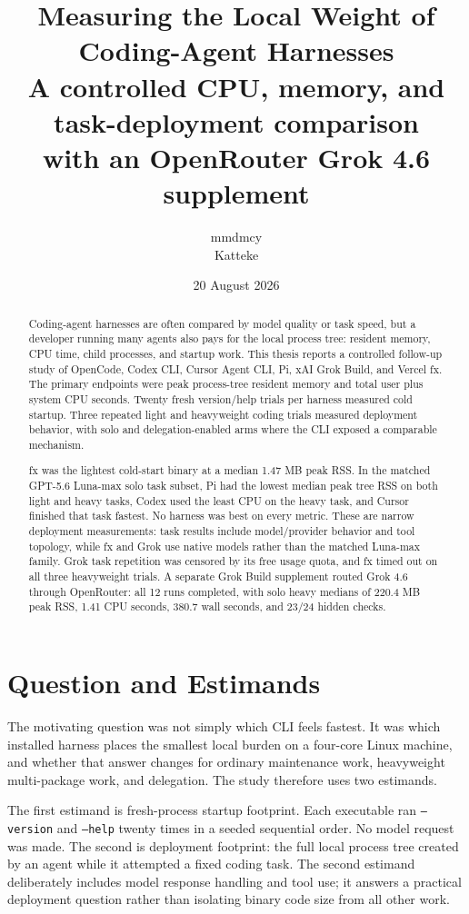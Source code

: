 \documentclass[11pt]{article}
\title{\textbf{Measuring the Local Weight of Coding-Agent Harnesses}\\
\large A controlled CPU, memory, and task-deployment comparison\\
\normalsize with an OpenRouter Grok 4.6 supplement}
\author{mmdmcy\\Katteke}
\date{20 August 2026}
\begin{document}
\maketitle

\begin{abstract}
Coding-agent harnesses are often compared by model quality or task speed, but a
developer running many agents also pays for the local process tree: resident
memory, CPU time, child processes, and startup work. This thesis reports a
controlled follow-up study of OpenCode, Codex CLI, Cursor Agent CLI, Pi, xAI
Grok Build, and Vercel fx. The primary endpoints were peak process-tree resident
memory and total user plus system CPU seconds. Twenty fresh version/help trials
per harness measured cold startup. Three repeated light and heavyweight coding
trials measured deployment behavior, with solo and delegation-enabled arms where
the CLI exposed a comparable mechanism.

fx was the lightest cold-start binary at a median 1.47 MB peak RSS. In the
matched GPT-5.6 Luna-max solo task subset, Pi had the lowest median peak tree
RSS on both light and heavy tasks, Codex used the least CPU on the heavy task,
and Cursor finished that task fastest. No harness was best on every metric.
These are narrow deployment measurements: task results include model/provider
behavior and tool topology, while fx and Grok use native models rather than the
matched Luna-max family. Grok task repetition was censored by its free usage
quota, and fx timed out on all three heavyweight trials. A separate Grok Build
supplement routed Grok 4.6 through OpenRouter: all 12 runs completed, with solo
heavy medians of 220.4 MB peak RSS, 1.41 CPU seconds, 380.7 wall seconds, and
23/24 hidden checks.
\end{abstract}

\section{Question and Estimands}

The motivating question was not simply which CLI feels fastest. It was which
installed harness places the smallest local burden on a four-core Linux machine,
and whether that answer changes for ordinary maintenance work, heavyweight
multi-package work, and delegation. The study therefore uses two estimands.

The first estimand is fresh-process startup footprint. Each executable ran
\texttt{--version} and \texttt{--help} twenty times in a seeded sequential
order. No model request was made. The second is deployment footprint: the full
local process tree created by an agent while it attempted a fixed coding task.
The second estimand deliberately includes model response handling and tool use;
it answers a practical deployment question rather than isolating binary code
size from all other work.
\end{document}
